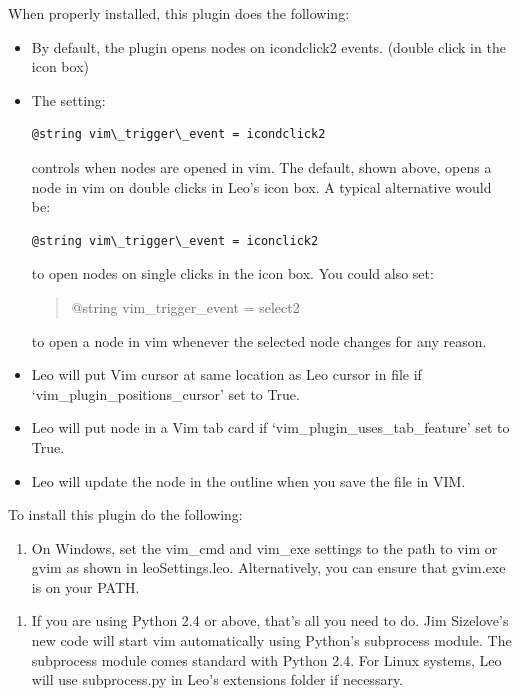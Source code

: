 \documentclass[a4paper,10pt,english]{sphinxmanual}
\begin{document}
When properly installed, this plugin does the following:
\begin{itemize}
\item {} 
By default, the plugin opens nodes on icondclick2 events.
(double click in the icon box)

\item {} 
The setting:

\begin{Verbatim}[commandchars=\\\{\}]
@string vim\_trigger\_event = icondclick2
\end{Verbatim}

controls when nodes are opened in vim.  The default, shown above,
opens a node in vim on double clicks in Leo's icon box.
A typical alternative would be:

\begin{Verbatim}[commandchars=\\\{\}]
@string vim\_trigger\_event = iconclick2
\end{Verbatim}

to open nodes on single clicks in the icon box.
You could also set:
\begin{quote}

@string vim\_trigger\_event = select2
\end{quote}

to open a node in vim whenever the selected node changes for any reason.

\item {} 
Leo will put Vim cursor at same location as Leo cursor in file if `vim\_plugin\_positions\_cursor' set to True.

\item {} 
Leo will put node in a Vim tab card if `vim\_plugin\_uses\_tab\_feature' set to True.

\item {} 
Leo will update the node in the outline when you save the file in VIM.

\end{itemize}

To install this plugin do the following:
\begin{enumerate}
\item {} 
On Windows, set the vim\_cmd and vim\_exe settings to the path to vim or gvim
as shown in leoSettings.leo. Alternatively, you can ensure that gvim.exe is
on your PATH.

\end{enumerate}
\begin{enumerate}
\item {} 
If you are using Python 2.4 or above, that's all you need to do. Jim
Sizelove's new code will start vim automatically using Python's subprocess
module. The subprocess module comes standard with Python 2.4. For Linux
systems, Leo will use subprocess.py in Leo's extensions folder if necessary.

\end{enumerate}
\end{document}
